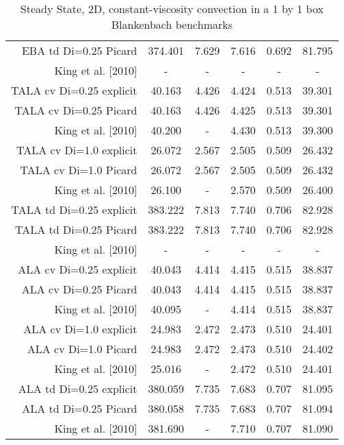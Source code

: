 \documentclass[10pt]{article}
\begin{document}
\begin{table}[h]
\begin{tabular} {| r c c c c c |}
EBA td Di=0.25 Picard & 374.401 & 7.629 & 7.616 & 0.692 & 81.795 \\
King et al. [2010] & - & - & - & -  & - \\
\hline 
TALA cv Di=0.25 explicit & 40.163 & 4.426 & 4.424 & 0.513 & 39.301 \\
TALA cv Di=0.25 Picard & 40.163 & 4.426 & 4.425 & 0.513 & 39.301 \\
King et al. [2010] & 40.200 & - & 4.430 & 0.513 & 39.300 \\
\hline 
TALA cv Di=1.0 explicit  & 26.072 & 2.567 & 2.505 & 0.509 & 26.432 \\
TALA cv Di=1.0 Picard & 26.072 & 2.567 & 2.505 & 0.509 & 26.432 \\
King et al. [2010] & 26.100 & - & 2.570 & 0.509  & 26.400 \\
\hline 
TALA td Di=0.25 explicit & 383.222 & 7.813 & 7.740 & 0.706 & 82.928 \\
TALA td Di=0.25 Picard & 383.222 & 7.813 & 7.740 & 0.706 & 82.928 \\
King et al. [2010] & - & - & - & -  & - \\
\hline 
ALA cv Di=0.25 explicit & 40.043 & 4.414 & 4.415 & 0.515 & 38.837 \\
ALA cv Di=0.25 Picard & 40.043 & 4.414 & 4.415 & 0.515 & 38.837 \\
King et al. [2010] & 40.095 & - & 4.414 & 0.515 & 38.837 \\
\hline 
ALA cv Di=1.0 explicit & 24.983 & 2.472 & 2.473 & 0.510 & 24.401 \\
ALA cv Di=1.0 Picard & 24.983 & 2.472 & 2.473 & 0.510 & 24.402 \\
King et al. [2010] & 25.016 & - & 2.472 & 0.510  & 24.401 \\
\hline 
ALA td Di=0.25 explicit & 380.059 & 7.735 & 7.683 & 0.707 & 81.095 \\
ALA td Di=0.25 Picard & 380.058 & 7.735 & 7.683 & 0.707 & 81.094 \\
King et al. [2010] & 381.690 & - & 7.710 & 0.707  & 81.090 \\
\hline 
\end{tabular}
\caption{Steady State, 2D, constant-viscosity convection in a 1 by 1 box Blankenbach benchmarks} 
\end{table}
\end{document}
